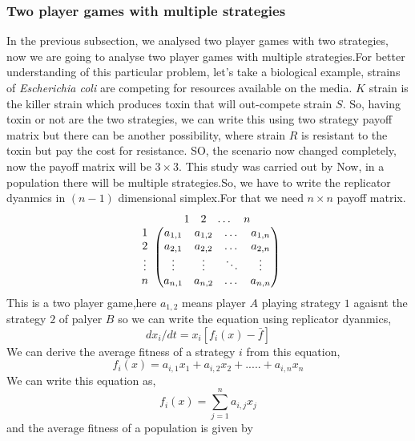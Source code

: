\documentclass{article}
\begin{document}
\subsubsection{Two player games with multiple strategies}
In the previous subsection, we analysed two player games with two strategies, now we are going to analyse two player games with multiple strategies.For better understanding of this particular problem, let's take a biological example, strains of \textit{Escherichia coli} are competing for resources available on the media. $K$ strain is the killer strain which produces toxin that will out-compete strain $S$. So, having toxin or not are the two strategies, we can write this using two strategy payoff matrix but there can be another possibility, where strain $R$ is resistant to the toxin but pay the cost for resistance. SO, the scenario now changed completely, now the payoff matrix will be $3 \times 3$. This study was carried out by\cite{Kerr2002}\cite{Czaran2002}
Now, in a population there will be multiple strategies.So, we have to write the replicator dyanmics in $(n-1)$ dimensional simplex.For that we need $n\times n$ payoff matrix.
\[
\begin{array}{c@{}c}
   & \begin{array}{cccc} 1 & 2 & \dots & n \end{array} \\ 
   \begin{array}{c} 
       1 \\ 
       2 \\ 
       \vdots \\ 
       n 
   \end{array} 
   & 
   \begin{pmatrix}
       a_{1,1} & a_{1,2} & \dots & a_{1,n} \\
       a_{2,1} & a_{2,2} & \dots & a_{2,n} \\
       \vdots & \vdots & \ddots & \vdots \\
       a_{n,1} & a_{n,2} & \dots & a_{n,n}
   \end{pmatrix}
\end{array}
\]
This is a two player game,here $a_{1,2}$ means player $A$ playing strategy $1$ agaisnt the strategy $2$ of palyer $B$ so we can write the equation using replicator dyanmics,
\[dx_i/dt=x_i[f_i(x)-\bar{f}]\]
We can derive the average fitness of a strategy $i$ from this equation,
\[f_i(x)=a_{i,1}x_1+a_{i,2}x_2+.....+a_{i,n}x_n\]
We can write this equation as,
\[f_i(x)=\sum_{j=1}^{n}a_{i,j}x_j\]
and the average fitness of a population is given by
\end{document}
